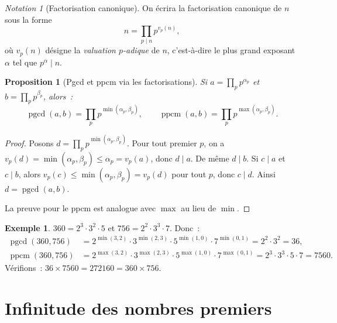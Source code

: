 \documentclass[12pt,a4paper,openany]{book}
\theoremstyle{definition}
\newtheorem{exemple}[definition]{Exemple}
\theoremstyle{plain}
\newtheorem{proposition}[definition]{Proposition}
\theoremstyle{remark}
\newtheorem{notation}[definition]{Notation}
\DeclareMathOperator{\pgcd}{pgcd}
\DeclareMathOperator{\ppcm}{ppcm}
\begin{document}
\begin{notation}[Factorisation canonique]
\label{not:factorisation}
On écrira la factorisation canonique de $n$ sous la forme
\[
  n = \prod_{p \mid n} p^{v_p(n)},
\]
où $v_p(n)$ désigne la
\emph{valuation $p$-adique} de $n$, c'est-à-dire le plus grand exposant $\alpha$
tel que $p^\alpha \mid n$.
\end{notation}

\begin{proposition}[Pgcd et ppcm via les factorisations]
\label{prop:pgcd_ppcm_fact}
Si $a = \prod_p p^{\alpha_p}$ et $b = \prod_p p^{\beta_p}$, alors~:
\[
  \pgcd(a,b) = \prod_p p^{\min(\alpha_p, \beta_p)}, \qquad
  \ppcm(a,b) = \prod_p p^{\max(\alpha_p, \beta_p)}.
\]
\end{proposition}

\begin{proof}
Posons $d = \prod_p p^{\min(\alpha_p, \beta_p)}$. Pour tout premier $p$, on a
$v_p(d) = \min(\alpha_p, \beta_p) \leq \alpha_p = v_p(a)$, donc $d \mid a$. De
même $d \mid b$. Si $c \mid a$ et $c \mid b$, alors $v_p(c) \leq \min(\alpha_p,
\beta_p) = v_p(d)$ pour tout $p$, donc $c \mid d$. Ainsi $d = \pgcd(a,b)$.

La preuve pour le ppcm est analogue avec $\max$ au lieu de $\min$.
\end{proof}

\begin{exemple}
\label{ex:pgcd_ppcm_fact}
$360 = 2^3 \cdot 3^2 \cdot 5$ et $756 = 2^2 \cdot 3^3 \cdot 7$. Donc~:
\begin{align*}
  \pgcd(360, 756) &= 2^{\min(3,2)} \cdot 3^{\min(2,3)} \cdot 5^{\min(1,0)} \cdot
    7^{\min(0,1)} = 2^2 \cdot 3^2 = 36, \\
  \ppcm(360, 756) &= 2^{\max(3,2)} \cdot 3^{\max(2,3)} \cdot 5^{\max(1,0)} \cdot
    7^{\max(0,1)} = 2^3 \cdot 3^3 \cdot 5 \cdot 7 = 7560.
\end{align*}
Vérifions~: $36 \times 7560 = 272160 = 360 \times 756$. \checkmark
\end{exemple}

\section{Infinitude des nombres premiers}
\label{sec:ch2:infinite}
\end{document}
